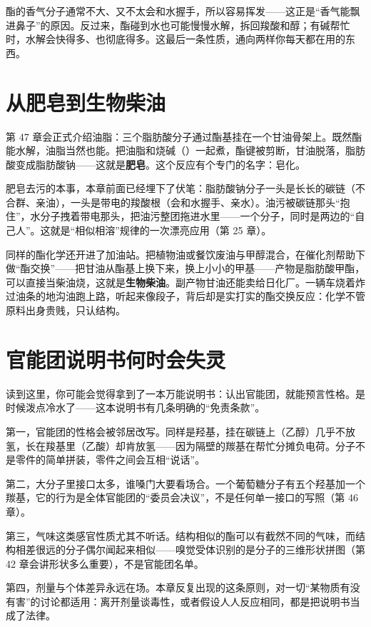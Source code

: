酯的香气分子通常不大、又不太会和水握手，所以容易挥发——这正是“香气能飘进鼻子”的原因。反过来，酯碰到水也可能慢慢水解，拆回羧酸和醇；有碱帮忙时，水解会快得多、也彻底得多。这最后一条性质，通向两样你每天都在用的东西。

\section{从肥皂到生物柴油}

第 47 章会正式介绍油脂：三个脂肪酸分子通过酯基挂在一个甘油骨架上。既然酯能水解，油脂当然也能。把油脂和烧碱（）一起煮，酯键被剪断，甘油脱落，脂肪酸变成脂肪酸钠——这就是\textbf{肥皂}。这个反应有个专门的名字：皂化。

肥皂去污的本事，本章前面已经埋下了伏笔：脂肪酸钠分子一头是长长的碳链（不合群、亲油），一头是带电的羧酸根（会和水握手、亲水）。油污被碳链那头“抱住”，水分子拽着带电那头，把油污整团拖进水里——一个分子，同时是两边的“自己人”。这就是“相似相溶”规律的一次漂亮应用（第 25 章）。

同样的酯化学还开进了加油站。把植物油或餐饮废油与甲醇混合，在催化剂帮助下做“酯交换”——把甘油从酯基上换下来，换上小小的甲基——产物是脂肪酸甲酯，可以直接当柴油烧，这就是\textbf{生物柴油}。副产物甘油还能卖给日化厂。一辆车烧着炸过油条的地沟油跑上路，听起来像段子，背后却是实打实的酯交换反应：化学不管原料出身贵贱，只认结构。

\section{官能团说明书何时会失灵}

读到这里，你可能会觉得拿到了一本万能说明书：认出官能团，就能预言性格。是时候泼点冷水了——这本说明书有几条明确的“免责条款”。

第一，官能团的性格会被邻居改写。同样是羟基，挂在碳链上（乙醇）几乎不放氢，长在羧基里（乙酸）却肯放氢——因为隔壁的羰基在帮忙分摊负电荷。分子不是零件的简单拼装，零件之间会互相“说话”。

第二，大分子里接口太多，谁嗓门大要看场合。一个葡萄糖分子有五个羟基加一个羰基，它的行为是全体官能团的“委员会决议”，不是任何单一接口的写照（第 46 章）。

第三，气味这类感官性质尤其不听话。结构相似的酯可以有截然不同的气味，而结构相差很远的分子偶尔闻起来相似——嗅觉受体识别的是分子的三维形状拼图（第 42 章会讲形状多么重要），不是官能团名单。

第四，剂量与个体差异永远在场。本章反复出现的这条原则，对一切“某物质有没有害”的讨论都适用：离开剂量谈毒性，或者假设人人反应相同，都是把说明书当成了法律。


